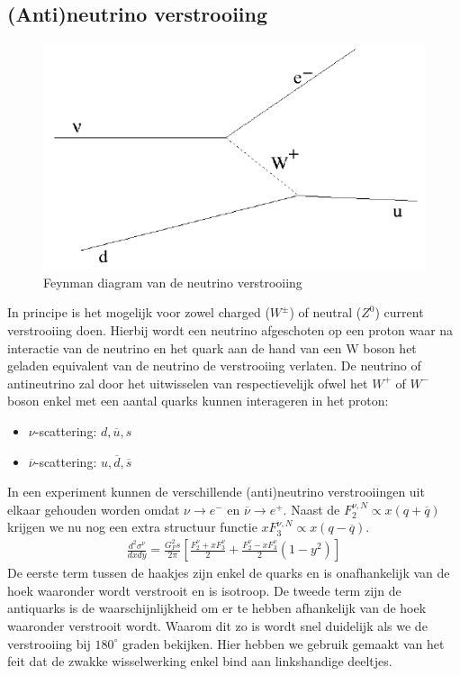 \documentclass[../main.tex]{subfiles}
\begin{document}
\subsection{(Anti)neutrino verstrooiing}%
\label{sub:_anti_neutrino_verstrooiing}

\begin{figure}[h]
    \centering
    \includegraphics[width=0.8\linewidth]{DIS_nucleon_structuur_pdf/neutrino_scat.png}
    \caption{Feynman diagram van de neutrino verstrooiing}%
    \label{fig:neutrino_scat}
\end{figure}

In principe is het mogelijk voor zowel charged ($W^\pm$) of neutral ($Z^0$) current verstrooiing doen. Hierbij wordt een neutrino afgeschoten op een proton waar na interactie van de neutrino en het quark aan de hand van een W boson het geladen equivalent van de neutrino de verstrooiing verlaten. De neutrino of antineutrino zal door het uitwisselen van respectievelijk ofwel het $W^+$ of $W^-$ boson enkel met een aantal quarks kunnen interageren in het proton:
\begin{itemize}
    \item $\nu$-scattering: $d,\overline u,s$
    \item $\overline \nu$-scattering: $u,\overline d,\overline s$
\end{itemize}
In een experiment kunnen de verschillende (anti)neutrino verstrooiingen uit elkaar gehouden worden omdat $\nu \rightarrow e^-$ en $\overline \nu \rightarrow e^+$. Naast de $F_2^{\nu,N}\propto x(q+\overline q)$ krijgen we nu nog een extra structuur functie $xF_3^{\nu,N}\propto x(q-\overline q)$.
\begin{equation}
    \begin{aligned}
        \label{eq:struct_func_nucleon_zwak}
        \frac{d^2 \sigma^\nu}{dxdy} = \frac{G_F^2 s}{2\pi} \left[ \frac{F_2^\nu+xF_3^\nu}{2} + \frac{F_2^\nu-xF_3^\nu}{2}(1-y^2) \right]
    \end{aligned}
\end{equation}
De eerste term tussen de haakjes zijn enkel de quarks en is onafhankelijk van de hoek waaronder wordt verstrooit en is isotroop. De tweede term zijn de antiquarks is de waarschijnlijkheid om er te hebben afhankelijk van de hoek waaronder verstrooit wordt. Waarom dit zo is wordt snel duidelijk als we de verstrooiing bij $180^\circ$ graden bekijken. Hier hebben we gebruik gemaakt van het feit dat de zwakke wisselwerking enkel bind aan linkshandige deeltjes.
\end{document}
